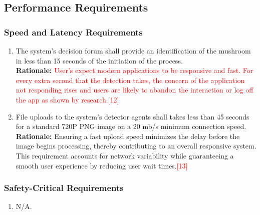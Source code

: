 \documentclass{article}
\begin{document}

\subsection{Performance Requirements}
\label{sub:performance_requirements}

\subsubsection{Speed and Latency Requirements}
\label{ssub:speed_and_latency_requirements}
\begin{enumerate}[{PR-SL}1. ]
	\item The system's decision forum shall provide an identification of the mushroom in less than 15 seconds of the initiation of the process.\\
	\textbf{Rationale:} \textcolor{red}{User's expect modern applications to be responsive and fast. For every extra second that the detection takes, the concern of the application not responding rises and users are likely to abandon the interaction or log off the app as shown by research.[12]}
	\item File uploads to the system's detector agents shall takes less than 45 seconds for a standard 720P PNG image on a 20 mb/s minimum connection speed.\\
	\textbf{Rationale:} Ensuring a fast upload speed minimizes the delay before the image begins processing, thereby contributing to an overall responsive system. This requirement accounts for network variability while guaranteeing a smooth user experience by reducing user wait times.\textcolor{red}{[13]}

\end{enumerate}

\subsubsection{Safety-Critical Requirements}
\label{ssub:safety_critical_requirements}
\begin{enumerate}[{PR-SC}1. ]
	\item N/A.
\end{enumerate}
\end{document}
